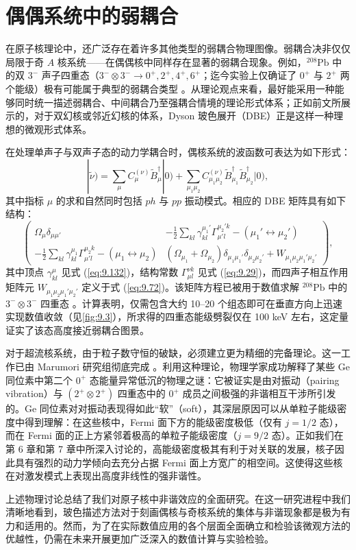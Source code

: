 \section{\label{sec:9.3.8}偶偶系统中的弱耦合}

在原子核理论中，还广泛存在着许多其他类型的弱耦合物理图像。弱耦合决非仅仅局限于奇 $A$ 核系统——在偶偶核中同样存在显著的弱耦合现象。例如，$^{208}\text{Pb}$
中的双 $3^{-}$ 声子四重态（$3^{-}\otimes3^{-}\to0^{+},2^{+},4^{+},6^{+}$；迄今实验上仅确证了
$0^{+}$ 与 $2^{+}$ 两个能级）极有可能属于典型的弱耦合类型 \cite{BBN74a,Sch76}。从理论观点来看，最好能采用一种能够同时统一描述弱耦合、中间耦合乃至强耦合情境的理论形式体系；正如前文所展示的，对于双幻核或邻近幻核的体系，Dyson
玻色展开（DBE）正是这样一种理想的微观形式体系。

在处理单声子与双声子态的动力学耦合时，偶核系统的波函数可表达为如下形式：
\begin{equation}
|\tilde{\nu})=\sum_{\mu}C^{(\nu)}_{\mu}\tilde{B}^{\dagger}_{\mu}|0)+\sum_{\mu_{1}\mu_{2}}C^{(\nu)}_{\mu_{1}\mu_{2}}\tilde{B}^{\dagger}_{\mu_{1}}\tilde{B}^{\dagger}_{\mu_{2}}|0),\label{eq:9.166}
\end{equation}
其中指标 $\mu$ 的求和自然同时包括 $ph$ 与 $pp$ 振动模式。相应的 DBE 矩阵具有如下结构：
\begin{equation}
\begin{pmatrix}\Omega_{\mu}\delta_{\mu\mu'} & -\frac{1}{2}\sum_{kl}\gamma^{\mu_{1}'}_{kl}\Gamma^{\mu_{2}'k}_{\mu'l}-(\mu_{1}'\leftrightarrow\mu_{2}')\\
-\frac{1}{2}\sum_{kl}\gamma^{\mu_{1}}_{kl}\Gamma^{\mu_{2}k}_{\mu'l}-(\mu_{1}\leftrightarrow\mu_{2}) & (\Omega_{\mu_{1}}+\Omega_{\mu_{2}})\delta_{\mu_{1}\mu_{1}'}\delta_{\mu_{2}\mu_{2}'}+W_{\mu_{1}\mu_{2}\mu_{1}'\mu_{2}'}
\end{pmatrix},\label{eq:9.167}
\end{equation}
其中顶点 $\gamma^{\mu}_{kl}$ 见式 (\ref{eq:9.132})，结构常数 $\Gamma^{\nu k}_{\mu l}$
见式 (\ref{eq:9.29})，而四声子相互作用矩阵元 $W_{\mu_{1}\mu_{2}\mu_{1}'\mu_{2}'}$
定义于式 (\ref{eq:9.72})。该矩阵方程已被用于数值求解 $^{208}\text{Pb}$ 中的 $3^{-}\otimes3^{-}$
四重态 \cite{Sch76}。计算表明，仅需包含大约 10–20 个组态即可在垂直方向上迅速实现数值收敛（见\ref{fig:9.3}），所求得的四重态能级劈裂仅在
100 keV 左右，这定量证实了该态高度接近弱耦合图景。

对于超流核系统，由于粒子数守恒的破缺，必须建立更为精细的完备理论。这一工作已由 Marumori 研究组彻底完成 \cite{IMS76}。利用这种理论，物理学家成功解释了某些
Ge 同位素中第二个 $0^{+}$ 态能量异常低沉的物理之谜：它被证实是由对振动（pairing vibration）与 $(2^{+}\otimes2^{+})$
四重态中的 $0^{+}$ 成员之间极强的非谐相互干涉所引发的。Ge 同位素对对振动表现得如此“软”（soft），其深层原因可以从单粒子能级密度中得到理解：在这些核中，Fermi
面下方的能级密度极低（仅有 $j=1/2$ 态），而在 Fermi 面的正上方紧邻着极高的单粒子能级密度（$j=9/2$ 态）。正如我们在第
6 章和第 7 章中所深入讨论的，高能级密度极其有利于对关联的发展，核子因此具有强烈的动力学倾向去充分占据 Fermi 面上方宽广的相空间。这使得这些核在对激发模式上表现出高度非线性的强非谐性。

上述物理讨论总结了我们对原子核中非谐效应的全面研究。在这一研究进程中我们清晰地看到，玻色描述方法对于刻画偶核与奇核系统的集体与非谐现象都是极为有力和适用的。然而，为了在实际数值应用的各个层面全面确立和检验该微观方法的优越性，仍需在未来开展更加广泛深入的数值计算与实验检验。
